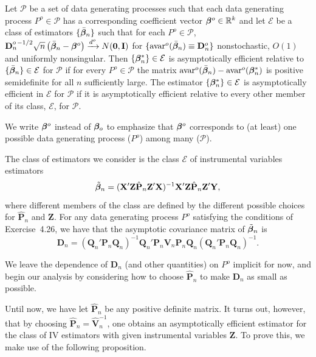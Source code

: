 \begin{definition}\label{def:4.43}
Let $\mathcal{P}$ be a set of data generating processes such that each data generating process $P^o \in \mathcal{P}$ has a corresponding coefficient vector $\boldsymbol{\beta}^o \in \mathbb{R}^k$ and let $\mathcal{E}$ be a class of estimators $\{\bar{\boldsymbol{\beta}}_n\}$ such that for each $P^o \in \mathcal{P}$, $\mathbf{D}_n^{o\,-1/2}\sqrt{n}\left(\bar{\boldsymbol{\beta}}_n - \boldsymbol{\beta}^o\right) \xrightarrow{d^o} N(\mathbf{0}, \mathbf{I})$ for $\{\mathrm{avar}^o(\bar{\boldsymbol{\beta}}_n) \equiv \mathbf{D}_n^o\}$ nonstochastic, $O(1)$ and uniformly nonsingular. Then $\{\boldsymbol{\beta}_n^*\} \in \mathcal{E}$ is asymptotically efficient relative to $\{\bar{\boldsymbol{\beta}}_n\} \in \mathcal{E}$ for $\mathcal{P}$ if for every $P^o \in \mathcal{P}$ the matrix $\mathrm{avar}^o(\bar{\boldsymbol{\beta}}_n) - \mathrm{avar}^o(\boldsymbol{\beta}_n^*)$ is positive semidefinite for all $n$ sufficiently large. The estimator $\{\boldsymbol{\beta}_n^*\} \in \mathcal{E}$ is asymptotically efficient in $\mathcal{E}$ for $\mathcal{P}$ if it is asymptotically efficient relative to every other member of its class, $\mathcal{E}$, for $\mathcal{P}$.
\end{definition}

We write $\boldsymbol{\beta}^o$ instead of $\boldsymbol{\beta}_o$ to emphasize that $\boldsymbol{\beta}^o$ corresponds to (at least)
one possible data generating process ($P^o$) among many ($\mathcal{P}$).

The class of estimators we consider is the class $\mathcal{E}$ of instrumental variables
estimators
\[
\tilde{\boldsymbol{\beta}}_n = (\mathbf{X}'\mathbf{Z}\hat{\mathbf{P}}_n\mathbf{Z}'\mathbf{X})^{-1}\mathbf{X}'\mathbf{Z}\hat{\mathbf{P}}_n\mathbf{Z}'\mathbf{Y},
\]
where different members of the class are defined by the different possible
choices for $\hat{\mathbf{P}}_n$ and $\mathbf{Z}$. For any data generating process $P^o$ satisfying the
conditions of Exercise~4.26, we have that the asymptotic covariance matrix
of $\tilde{\boldsymbol{\beta}}_n$ is
\[
\mathbf{D}_n = (\mathbf{Q}_n'\mathbf{P}_n\mathbf{Q}_n)^{-1}\mathbf{Q}_n'\mathbf{P}_n\mathbf{V}_n\mathbf{P}_n\mathbf{Q}_n(\mathbf{Q}_n'\mathbf{P}_n\mathbf{Q}_n)^{-1}.
\]

We leave the dependence of $\mathbf{D}_n$ (and other quantities) on $P^o$ implicit for
now, and begin our analysis by considering how to choose $\hat{\mathbf{P}}_n$ to make $\mathbf{D}_n$
as small as possible.

Until now, we have let $\hat{\mathbf{P}}_n$ be any positive definite matrix. It turns out,
however, that by choosing $\hat{\mathbf{P}}_n = \hat{\mathbf{V}}_n^{-1}$, one obtains an asymptotically efficient estimator for the class of IV estimators with given instrumental
variables $\mathbf{Z}$. To prove this, we make use of the following proposition.

